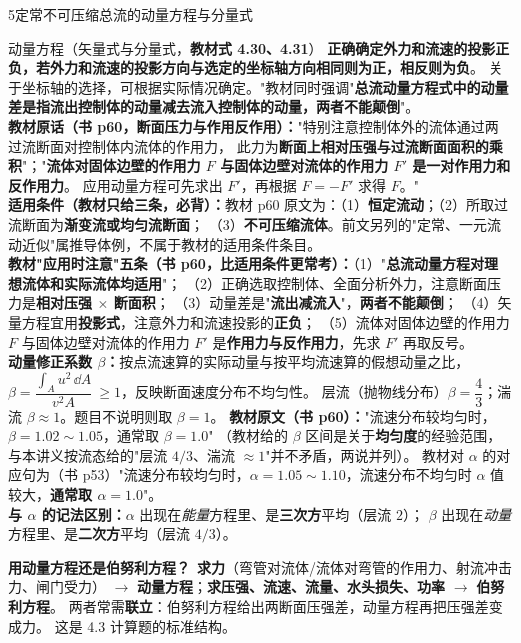 \begin{kaodian}{5}{定常不可压缩总流的动量方程与分量式}
\begin{gongshi}{动量方程（矢量式与分量式，\textbf{教材式 4.30、4.31}）}
\textbf{正确确定外力和流速的投影正负，若外力和流速的投影方向与选定的坐标轴方向相同则为正，相反则为负}。
关于坐标轴的选择，可根据实际情况确定。"教材同时强调"\textbf{总流动量方程式中的动量差是指流出控制体的动量减去流入控制体的动量，两者不能颠倒}"。\\
\textbf{教材原话（书 p60，断面压力与作用反作用）：}"特别注意控制体外的流体通过两过流断面对控制体内流体的作用力，
此力为\textbf{断面上相对压强与过流断面面积的乘积}"；"\textbf{流体对固体边壁的作用力 $F$ 与固体边壁对流体的作用力 $F'$ 是一对作用力和反作用力}。
应用动量方程可先求出 $F'$，再根据 $F=-F'$ 求得 $F$。"\\
\textbf{适用条件（教材只给\textbf{三条}，必背）：}教材 p60 原文为：（1）\textbf{恒定流动}；（2）所取过流断面为\textbf{渐变流或均匀流断面}；
（3）\textbf{不可压缩流体}。前文另列的"定常、一元流动近似"属推导体例，不属于教材的适用条件条目。\\
\textbf{教材"应用时注意"五条（书 p60，比适用条件更常考）：}（1）"\textbf{总流动量方程对理想流体和实际流体均适用}"；
（2）正确选取控制体、全面分析外力，注意断面压力是\textbf{相对压强 $\times$ 断面积}；
（3）动量差是"\textbf{流出减流入}"，\textbf{两者不能颠倒}；
（4）矢量方程宜用\textbf{投影式}，注意外力和流速投影的\textbf{正负}；
（5）流体对固体边壁的作用力 $F$ 与固体边壁对流体的作用力 $F'$ 是\textbf{作用力与反作用力}，先求 $F'$ 再取反号。\\
\textbf{动量修正系数 $\beta$：}按点流速算的实际动量与按平均流速算的假想动量之比，
$\beta=\dfrac{\displaystyle\int_A u^2\,\dd A}{v^2 A}\ \ge 1$，反映断面速度分布不均匀性。
层流（抛物线分布）$\beta=\dfrac{4}{3}$；湍流 $\beta\approx 1$。题目不说明则取 $\beta=1$。
\textbf{教材原文（书 p60）：}"流速分布较均匀时，$\beta=1.02\sim1.05$，通常取 $\beta=1.0$"
（教材给的 $\beta$ 区间是关于\textbf{均匀度}的经验范围，与本讲义按流态给的"层流 $4/3$、湍流 $\approx1$"并不矛盾，两说并列）。
教材对 $\alpha$ 的对应句为（书 p53）"流速分布较均匀时，$\alpha=1.05\sim1.10$，流速分布不均匀时 $\alpha$ 值较大，\textbf{通常取 $\alpha=1.0$}"。\\
\textbf{与 $\alpha$ 的记法区别：}$\alpha$ 出现在\emph{能量}方程里、是\textbf{三次方}平均（层流 $2$）；
$\beta$ 出现在\emph{动量}方程里、是\textbf{二次方}平均（层流 $4/3$）。
\end{gongshi}

\begin{tishi}
\textbf{用动量方程还是伯努利方程？}\ \textbf{求力}（弯管对流体/流体对弯管的作用力、射流冲击力、闸门受力）
$\to$ \textbf{动量方程}；\textbf{求压强、流速、流量、水头损失、功率} $\to$ \textbf{伯努利方程}。
两者常需\textbf{联立}：伯努利方程给出两断面压强差，动量方程再把压强差变成力。
这是 4.3 计算题的标准结构。
\end{tishi}


\end{kaodian}

